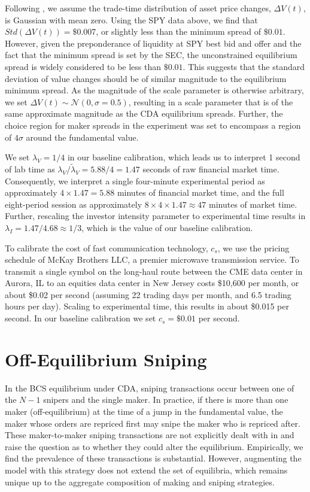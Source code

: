 \documentclass[12pt]{article}
\begin{document}
\begin{appendices}
Following \citet{Aldrich2016}, we assume the trade-time distribution of asset price changes, $\Delta V(t)$, is Gaussian with mean zero. Using the SPY data above, we find that $Std(\Delta V(t)) = \$0.007$, or slightly less than the minimum spread of $\$0.01$.  However, given the preponderance of liquidity at SPY best bid and offer and the fact that the minimum spread is set by the SEC, the unconstrained equilibrium spread is widely considered to be less than $\$0.01$. This suggests that the standard deviation of value changes should be of similar magnitude to the equilibrium minimum spread. As the magnitude of the scale parameter is otherwise arbitrary, we set $\Delta V(t) \sim \mathcal{N}(0,\sigma=0.5)$, resulting in a scale parameter that is of the same approximate magnitude as the CDA equilibrium spreads. Further, the choice region for maker spreads in the experiment was set to encompass a region of $4\sigma$ around the fundamental value.

We set $\lambda_V = 1/4$ in our baseline calibration, which leads us to interpret 1 second of lab time as $\lambda_V/\tilde{\lambda}_{V} = 5.88/4 = 1.47$ seconds of raw financial market time. Consequently, we interpret a single four-minute experimental period as approximately $4 \times 1.47 = 5.88$ minutes of financial market time, and the full eight-period session as approximately $8 \times 4 \times 1.47 \approx 47$ minutes of market time. Further, rescaling the investor intensity parameter to experimental time results in $\lambda_I = 1.47/4.68 \approx 1/3$, which is the value of our baseline calibration.

To calibrate the cost of fast communication technology, $c_s$, we use the pricing schedule of McKay Brothers LLC, a premier microwave transmission service. To transmit a single symbol on the long-haul route between the CME data center in Aurora, IL to an equities data center in New Jersey costs \$10,600 per month, or about \$0.02 per second (assuming 22 trading days per month, and 6.5 trading hours per day). Scaling to experimental time, this results in about \$0.015 per second. In our baseline calibration we set $c_s = \$0.01$ per second.

\newpage

\section{Off-Equilibrium Sniping}
\label{makerSniping}

In the BCS equilibrium under CDA, sniping transactions occur between one of the $N-1$ snipers and the single maker. In practice, if there is more than one maker (off-equilibrium) at the time of a jump in the fundamental value, the maker whose orders are repriced first may snipe the maker who is repriced after. These maker-to-maker sniping transactions are not explicitly dealt with in  \cite{Budish2015} and raise the question as to whether they could alter the equilibrium. Empirically, we find the prevalence of these transactions is substantial. However, augmenting the model with this strategy does not extend the set of equilibria, which remains unique up to the aggregate composition of making and sniping strategies.  


\end{appendices}
\end{document}
